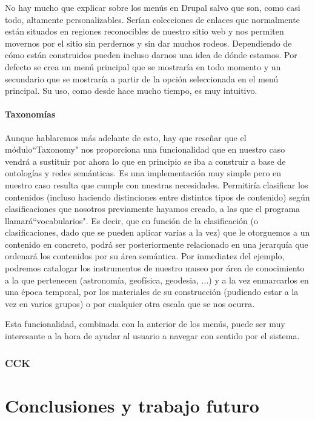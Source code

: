 \par No hay mucho que explicar sobre los menús en Drupal salvo que son, como casi todo, altamente personalizables. Serían colecciones de enlaces que normalmente están situados en regiones reconocibles de nuestro sitio web y nos permiten movernos por el sitio sin perdernos y sin dar muchos rodeos. Dependiendo de cómo están construidos pueden incluso darnos una idea de dónde estamos. Por defecto se crea un menú principal que se mostraría en todo momento y un secundario que se mostraría a partir de la opción seleccionada en el menú principal. Su uso, como desde hace mucho tiempo, es muy intuitivo.

\paragraph{Taxonomías}

\par Aunque hablaremos más adelante de esto, hay que reseñar que el módulo``Taxonomy" nos proporciona una funcionalidad que en nuestro caso vendrá a sustituir por ahora lo que en principio se iba a construir a base de ontologías y redes semánticas. Es una implementación muy simple pero en nuestro caso resulta que cumple con nuestras necesidades. Permitiría clasificar los contenidos (incluso haciendo distinciones entre distintos tipos de contenido) según clasificaciones que nosotros previamente hayamos creado, a las que el programa llamará``vocabularios". Es decir, que en función de la clasificación (o clasificaciones, dado que se pueden aplicar varias a la vez) que le otorguemos a un contenido en concreto, podrá ser posteriormente relacionado en una jerarquía que ordenará los contenidos por su área semántica. Por inmediatez del ejemplo, podremos catalogar los instrumentos de nuestro museo por área de conocimiento a la que pertenecen (astronomía, geofísica, geodesia, ...) y a la vez enmarcarlos en una época temporal, por los materiales de su construcción (pudiendo estar a la vez en varios grupos) o por cualquier otra escala que se nos ocurra.
\par Esta funcionalidad, combinada con la anterior de los menús, puede ser muy interesante a la hora de ayudar al usuario a navegar con sentido por el sistema.

\subsubsection{CCK}
\par 






\section{Conclusiones y trabajo futuro}


